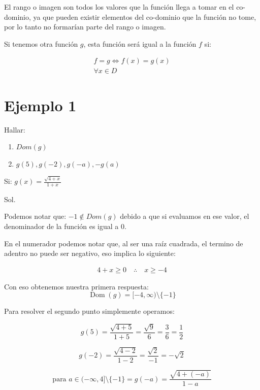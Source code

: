 El rango o imagen son todos los valores que la función llega a tomar en el co-dominio, ya que pueden existir elementos del co-dominio que la función no tome, por lo tanto no formarían parte del rango o imagen.

Si tenemos otra función \(g\), esta función será igual a la función \(f\) si:

\begin{gather*}
    f = g \iff f(x) = g(x) \\
    \forall x \in D
\end{gather*}

\section{Ejemplo 1}

Hallar:

\begin{enumerate}
    \item \(Dom(g)\)
    \item \(g(5), g(-2), g(-a), -g(a)\)
\end{enumerate}

Si: \( \displaystyle g(x) = \frac{\sqrt{4 + x}}{1 + x} \)

Sol. 

Podemos notar que: \( \displaystyle -1 \notin Dom(g) \) 
debido a que si evaluamos en ese valor, el denominador de la función es igual a \(0\).

En el numerador podemos notar que, al ser una raíz cuadrada, el termino de adentro no puede ser negativo, eso implica lo siguiente: 

\begin{gather*}
    4 + x \geq 0 \quad \therefore \quad x \geq -4 
\end{gather*}

Con eso obtenemos nuestra primera respuesta:
\[
\operatorname{Dom}(g) = [-4,\infty) \setminus \{-1\}
\]

Para resolver el segundo punto simplemente operamos: 

\begin{displaymath}
    g(5) = \frac{\sqrt{4+5}}{1+5} = \frac{\sqrt{9}}{6} = \frac{3}{6} = \frac{1}{2}
\end{displaymath}

\begin{displaymath}
    g(-2) = \frac{\sqrt{4-2}}{1-2} = \frac{\sqrt{2}}{-1} = - \sqrt{2}
\end{displaymath}

\begin{displaymath}
    \text{para } a \in (-\infty,4] \setminus \{-1\} = g(-a) = \frac{\sqrt{4+(-a)}}{1-a} 
\end{displaymath}

